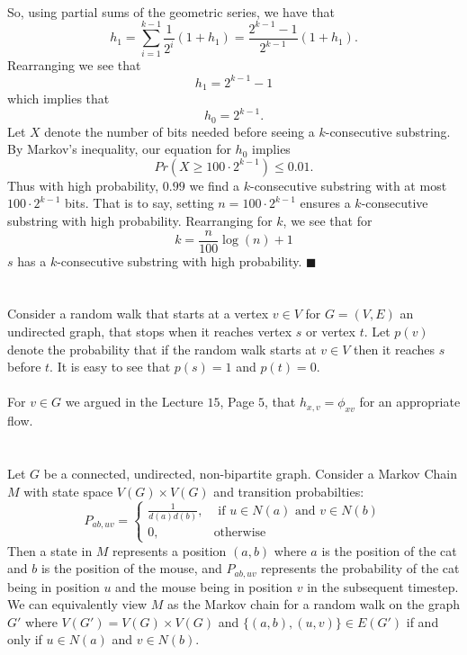 \documentclass[letterpaper,12pt,oneside,onecolumn]{article}
\begin{document}
\paragraph{}
So, using partial sums of the geometric series, we have that 
$$h_1 = \sum_{i=1}^{k-1} \frac{1}{2^i}(1+h_1) = \frac{2^{k-1}-1}{2^{k-1}}(1+h_1).$$
Rearranging we see that
$$h_1 = 2^{k-1} - 1$$
which implies that
$$h_0 = 2^{k-1}.$$
Let $X$ denote the number of bits needed before seeing a $k$-consecutive substring. By Markov's inequality, our equation for $h_0$ implies
$$Pr(X \geq 100\cdot2^{k-1}) \leq 0.01.$$
Thus with high probability, $0.99$ we find a $k$-consecutive substring with at most $100 \cdot 2^{k-1}$ bits. That is to say, setting $n = 100\cdot 2^{k-1}$ ensures a $k$-consecutive substring with high probability. Rearranging for $k$, we see that for
$$k =\frac{n}{100}\log(n) + 1$$
$s$ has a $k$-consecutive substring with high probability. $\blacksquare$
\newpage
\section{}
\paragraph{}
Consider a random walk that starts at a vertex $v \in V$ for $G=(V,E)$ an undirected graph, that stops when it reaches vertex $s$ or vertex $t$. Let $p(v)$ denote the probability that if the random walk starts at $v \in V$ then it reaches $s$ before $t$. It is easy to see that $p(s) = 1$ and $p(t) = 0$.
\paragraph{}
For $v \in G$ we argued in the Lecture $15$, Page $5$, that $h_{x,v} = \phi_{xv}$ for an appropriate flow.
\newpage
\section{}
\paragraph{}
Let $G$ be a connected, undirected, non-bipartite graph. Consider a Markov Chain $M$ with state space $V(G) \times V(G)$ and transition probabilties:
$$P_{ab, uv} = \begin{cases}
\frac{1}{d(a)d(b)}, &\text{ if } u \in N(a)\text{ and } v \in N(b) \\
0, &\text{otherwise}
\end{cases}$$
Then a state in $M$ represents a position $(a,b)$ where $a$ is the position of the cat and $b$ is the position of the mouse, and $P_{ab,uv}$ represents the probability of the cat being in position $u$ and the mouse being in position $v$ in the subsequent timestep. We can equivalently view $M$ as the Markov chain for a random walk on the graph $G'$ where $V(G') = V(G) \times V(G)$ and $\{(a,b), (u,v)\} \in E(G')$ if and only if $u \in N(a)$ and $v \in N(b)$.
\end{document}
